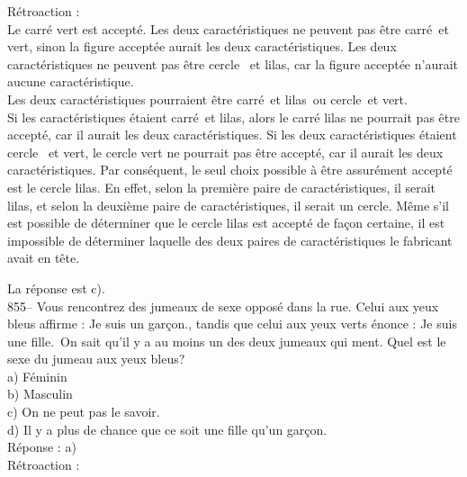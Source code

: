 ﻿\documentclass[letterpaper, 12pt]{article}
\begin{document}
R\'etroaction : \\
Le carr\'e vert est accept\'e.  Les deux caract\'eristiques ne
peuvent pas \^etre \og carr\'e\fg\ et \og vert\fg , sinon la figure
accept\'ee aurait les deux caract\'eristiques.  Les deux
caract\'eristiques ne peuvent pas \^etre \og cercle \fg\ et \og
lilas\fg , car la figure accept\'ee n'aurait aucune caract\'eristique. \\

Les deux caract\'eristiques pourraient \^etre \og carr\'e\fg\ et
\og lilas\fg\ ou \og cercle\fg\ et \og vert\fg.\\
Si les caract\'eristiques \'etaient \og carr\'e\fg\ et \og lilas\fg,
alors le carr\'e lilas ne pourrait pas \^etre accept\'e, car il
aurait les deux caract\'eristiques. Si les deux caract\'eristiques
\'etaient \og cercle \fg\ et \og vert\fg , le cercle vert ne
pourrait pas \^etre accept\'e, car il aurait les deux
caract\'eristiques. Par cons\'equent, le seul choix possible \`a
\^etre assur\'ement accept\'e est le cercle lilas.  En effet, selon
la premi\`ere paire de caract\'eristiques, il serait lilas, et selon
la deuxi\`eme paire de caract\'eristiques, il serait un cercle.
M\^eme s'il est possible de d\'eterminer que le cercle lilas est
accept\'e de fa\c con certaine, il est impossible de d\'eterminer
laquelle des deux paires de caract\'eristiques le fabricant avait en
t\^ete.

La r\'eponse est c).\\

855-- Vous rencontrez des jumeaux de sexe oppos\'e dans la rue.
Celui aux yeux bleus affirme : \og Je suis un gar\c con.\fg , tandis
que celui aux yeux verts \'enonce : \og Je suis une fille.\fg\  On
sait qu'il y a au moins un des deux jumeaux qui ment.  Quel est le
sexe du jumeau aux yeux bleus?\\
a) F\'eminin\\
b) Masculin\\
c) On ne peut pas le savoir.\\
d) Il y a plus de chance que ce soit une fille qu'un gar\c con.\\

R\'eponse : a)\\

R\'etroaction : \\
\end{document}
